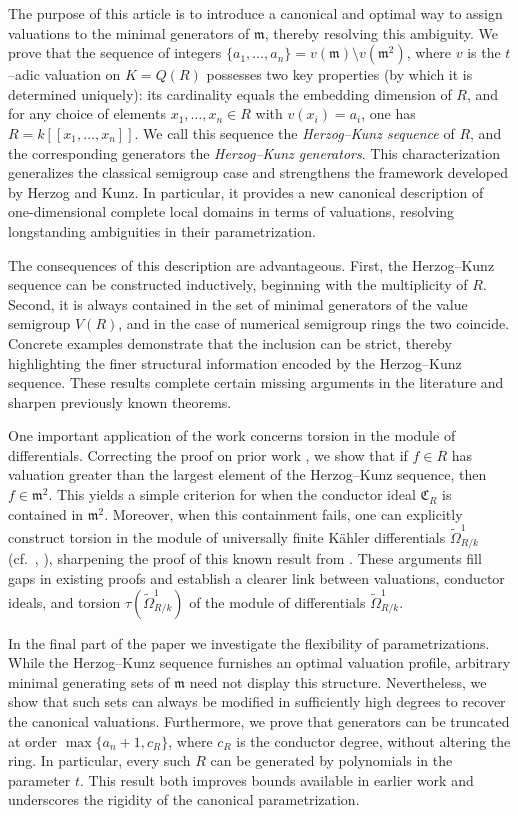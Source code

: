 \documentclass[12pt]{amsart}
\theoremstyle{plain}%
\theoremstyle{definition}
\renewcommand{\(}{\left(}
\renewcommand{\)}{\right)}
\begin{document}
The purpose of this article is to introduce a canonical and optimal way to assign valuations to the minimal generators of $\mathfrak{m}$, thereby resolving this ambiguity. We prove that the sequence of integers $\{a_1, \dots, a_n\} = v(\mathfrak{m}) \setminus v(\mathfrak{m}^2)$, where $v$ is the $t$--adic valuation on $K = Q(R)$ possesses two key properties (by which it is determined uniquely): its cardinality equals the embedding dimension of $R$, and for any choice of elements $x_1,\dots,x_n \in R$ with $v(x_i)=a_i$, one has $R = k[[x_1,\dots,x_n]]$. We call this sequence the \emph{Herzog--Kunz sequence} of $R$, and the corresponding generators the \emph{Herzog--Kunz generators}. This characterization generalizes the classical semigroup case and strengthens the framework developed by Herzog and Kunz. In particular, it provides a new canonical description of one-dimensional complete local domains in terms of valuations, resolving longstanding ambiguities in their parametrization.

The consequences of this description are advantageous. First, the Herzog--Kunz sequence can be constructed inductively, beginning with the multiplicity of $R$. Second, it is always contained in the set of minimal generators of the value semigroup $V(R)$, and in the case of numerical semigroup rings the two coincide. Concrete examples demonstrate that the inclusion can be strict, thereby highlighting the finer structural information encoded by the Herzog--Kunz sequence. These results complete certain missing arguments in the literature and sharpen previously known theorems.

One important application of the work concerns torsion in the module of differentials. Correcting the proof on prior work \cite{HMM}, we show that if $f \in R$ has valuation greater than the largest element of the Herzog--Kunz sequence, then $f \in \mathfrak{m}^2$. This yields a simple criterion for when the conductor ideal $\mathfrak{C}_R$ is contained in $\mathfrak{m}^2$. Moreover, when this containment fails, one can explicitly construct torsion in the module of universally finite K\"ahler differentials $\widetilde{\Omega}^1_{R/k}$ (cf.\ \cite[\S 11]{KD}, ), sharpening the proof of this known result from \cite{HMM}. These arguments fill gaps in existing proofs and establish a clearer link between valuations, conductor ideals, and torsion $\tau(\widetilde{\Omega}^1_{R/k})$ of the module of differentials $\widetilde{\Omega}^1_{R/k}$.

In the final part of the paper we investigate the flexibility of parametrizations. While the Herzog--Kunz sequence furnishes an optimal valuation profile, arbitrary minimal generating sets of $\mathfrak{m}$ need not display this structure. Nevertheless, we show that such sets can always be modified in sufficiently high degrees to recover the canonical valuations. Furthermore, we prove that generators can be truncated at order $\max\{a_n+1, c_R\}$, where $c_R$ is the conductor degree, without altering the ring. In particular, every such $R$ can be generated by polynomials in the parameter $t$. This result both improves bounds available in earlier work and underscores the rigidity of the canonical parametrization.
\end{document}
